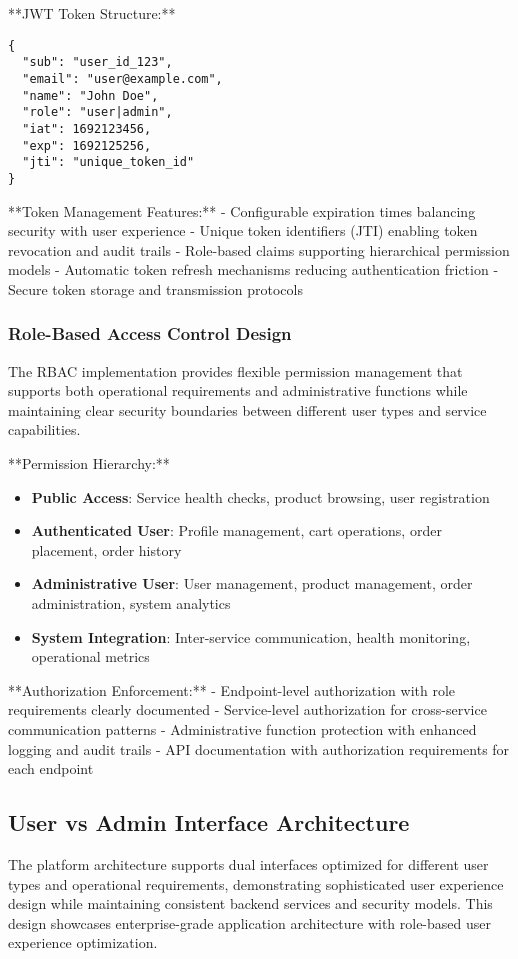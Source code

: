 **JWT Token Structure:**
\begin{verbatim}
{
  "sub": "user_id_123",
  "email": "user@example.com", 
  "name": "John Doe",
  "role": "user|admin",
  "iat": 1692123456,
  "exp": 1692125256,
  "jti": "unique_token_id"
}
\end{verbatim}

**Token Management Features:**
- Configurable expiration times balancing security with user experience
- Unique token identifiers (JTI) enabling token revocation and audit trails
- Role-based claims supporting hierarchical permission models
- Automatic token refresh mechanisms reducing authentication friction
- Secure token storage and transmission protocols

\subsubsection{Role-Based Access Control Design}
The RBAC implementation provides flexible permission management that supports both operational requirements and administrative functions while maintaining clear security boundaries between different user types and service capabilities.

**Permission Hierarchy:**
\begin{itemize}
\item \textbf{Public Access}: Service health checks, product browsing, user registration
\item \textbf{Authenticated User}: Profile management, cart operations, order placement, order history
\item \textbf{Administrative User}: User management, product management, order administration, system analytics
\item \textbf{System Integration}: Inter-service communication, health monitoring, operational metrics
\end{itemize}

**Authorization Enforcement:**
- Endpoint-level authorization with role requirements clearly documented
- Service-level authorization for cross-service communication patterns
- Administrative function protection with enhanced logging and audit trails
- API documentation with authorization requirements for each endpoint

\subsection{User vs Admin Interface Architecture}

The platform architecture supports dual interfaces optimized for different user types and operational requirements, demonstrating sophisticated user experience design while maintaining consistent backend services and security models. This design showcases enterprise-grade application architecture with role-based user experience optimization.

